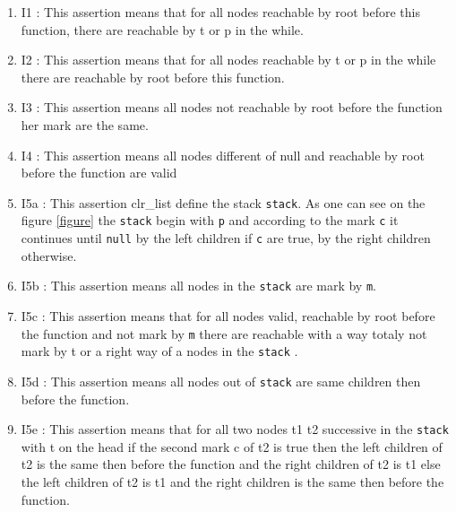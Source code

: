 \begin {enumerate}
\item {I1} : This assertion means that for all nodes reachable by root
  before this function, there are reachable by t or p in the while.
\item {I2} : This assertion means that for all nodes reachable by t or
  p in the while there are reachable by root before this function.
\item {I3} : This assertion means all nodes not reachable by root before the
  function her mark are the same.
\item {I4} :  This assertion means all nodes different of null and
  reachable by root before the function are valid
\item {I5a} : This assertion clr\_list define the stack
  \texttt{stack}. As one can see on the figure \ref{figure} the
  \texttt{stack} begin with \texttt{p} and according to the mark \texttt{c} it
  continues until \texttt{null} by the left children if \texttt{c} are true, by the right children otherwise. 
\item {I5b} : This assertion means all nodes in the
  \texttt{stack} are mark by \texttt{m}.
\item {I5c} : This assertion means that for all nodes valid, reachable by root
  before the function and not mark by \texttt{m} there are reachable with a way
  totaly not mark by t or a right way of a nodes in the \texttt{stack} .
\item {I5d} : This assertion means all nodes out of \texttt{stack} are
  same children then before the function. 
\item {I5e} : This assertion means that for all two nodes t1 t2 successive in
  the \texttt{stack} with t on the head if the second mark c of t2 is
  true then the left children of t2 is the same then before the
  function and the right children of t2 is t1 else the left children
  of t2 is t1 and the right children  is the same then before the
  function.

\end{enumerate}
